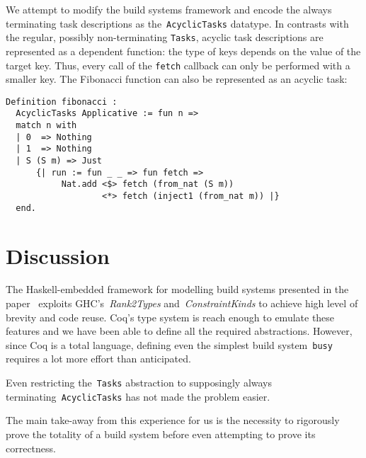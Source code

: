 \documentclass[sigplan,review]{acmart}\settopmatter{printfolios=true,printccs=false,printacmref=false}
\newcommand{\hs}{\texttt}
\begin{document}
We attempt to modify the build systems framework and encode the always terminating
task descriptions as the~\hs{AcyclicTasks} datatype. In contrasts with the regular,
possibly non-terminating \hs{Tasks}, acyclic task descriptions are represented as
a dependent function: the type of keys depends on the value of the target key.
Thus, every call of the \hs{fetch} callback can only be performed with a smaller key.
The Fibonacci function can also be represented as an acyclic task:

\vspace{-1mm}
\begin{verbatim}
Definition fibonacci :
  AcyclicTasks Applicative := fun n =>
  match n with
  | 0  => Nothing
  | 1  => Nothing
  | S (S m) => Just
      {| run := fun _ _ => fun fetch =>
           Nat.add <$> fetch (from_nat (S m))
                   <*> fetch (inject1 (from_nat m)) |}
  end.
\end{verbatim}
\vspace{-1mm}

\vspace{-3mm}
\section{Discussion}\label{sec-discussion}
\vspace{-1mm}

The Haskell-embedded framework for modelling build systems presented in the
paper~\cite{Mokhov2018icfp} exploits GHC's~\emph{Rank2Types}
and~\emph{ConstraintKinds} to achieve high level of brevity and code reuse.
Coq's type system is reach enough to emulate these features and we have been able
to define all the required abstractions. However, since Coq is a total language,
defining even the simplest build system~\hs{busy} requires a lot more
effort than anticipated.

Even restricting the~\hs{Tasks} abstraction to
supposingly always terminating~\hs{AcyclicTasks} has not made the problem easier.

The main take-away from this experience for us is the necessity to rigorously
prove the totality of a build system before even attempting to prove its correctness.







\end{document}
